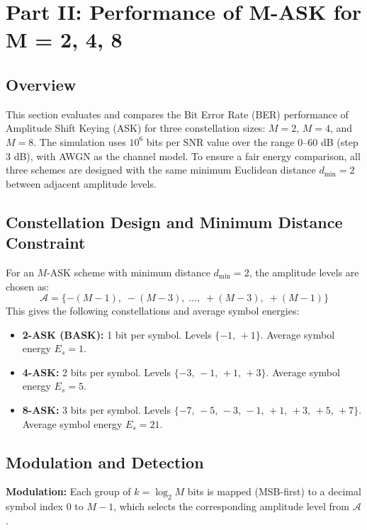 
\section{Part II: Performance of M-ASK for M = 2, 4, 8}

\subsection{Overview}

This section evaluates and compares the Bit Error Rate (BER) performance of Amplitude Shift Keying (ASK) for three constellation sizes: $M = 2$, $M = 4$, and $M = 8$. The simulation uses $10^6$ bits per SNR value over the range 0--60 dB (step 3 dB), with AWGN as the channel model. To ensure a fair energy comparison, all three schemes are designed with the same minimum Euclidean distance $d_{\min} = 2$ between adjacent amplitude levels.

\subsection{Constellation Design and Minimum Distance Constraint}

For an $M$-ASK scheme with minimum distance $d_{\min} = 2$, the amplitude levels are chosen as:
\[
    \mathcal{A} = \{-(M-1),\;-(M-3),\;\ldots,\;+(M-3),\;+(M-1)\}
\]
This gives the following constellations and average symbol energies:

\begin{itemize}
    \item \textbf{2-ASK (BASK):} 1 bit per symbol. Levels $\{-1,\,+1\}$. Average symbol energy $E_s = 1$.
    \item \textbf{4-ASK:} 2 bits per symbol. Levels $\{-3,\,-1,\,+1,\,+3\}$. Average symbol energy $E_s = 5$.
    \item \textbf{8-ASK:} 3 bits per symbol. Levels $\{-7,\,-5,\,-3,\,-1,\,+1,\,+3,\,+5,\,+7\}$. Average symbol energy $E_s = 21$.
\end{itemize}

\subsection{Modulation and Detection}

\textbf{Modulation:} Each group of $k = \log_2 M$ bits is mapped (MSB-first) to a decimal symbol index $0$ to $M-1$, which selects the corresponding amplitude level from $\mathcal{A}$.

